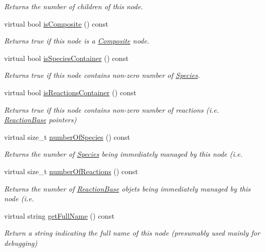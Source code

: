\begin{DoxyCompactItemize}
\begin{DoxyCompactList}\small\item\em Returns the number of children of this node. \end{DoxyCompactList}\item 
virtual bool \hyperlink{classComponent_a14bcb60799865752cd293fba2076d84a}{is\+Composite} () const 
\begin{DoxyCompactList}\small\item\em Returns true if this node is a \hyperlink{classComposite}{Composite} node. \end{DoxyCompactList}\item 
virtual bool \hyperlink{classComponent_a0daf865ff32aff9e68316c65b681cbf9}{is\+Species\+Container} () const 
\begin{DoxyCompactList}\small\item\em Returns true if this node contains non-\/zero number of \hyperlink{classSpecies}{Species}. \end{DoxyCompactList}\item 
virtual bool \hyperlink{classComponent_a506e080028078ef9a753d854c60904a3}{is\+Reactions\+Container} () const 
\begin{DoxyCompactList}\small\item\em Returns true if this node contains non-\/zero number of reactions (i.\+e. \hyperlink{classReactionBase}{Reaction\+Base} pointers) \end{DoxyCompactList}\item 
virtual size\+\_\+t \hyperlink{classComponent_ae99bcb165a9403e64ffea2b840192b4c}{number\+Of\+Species} () const 
\begin{DoxyCompactList}\small\item\em Returns the number of \hyperlink{classSpecies}{Species} being immediately managed by this node (i.\+e. \end{DoxyCompactList}\item 
virtual size\+\_\+t \hyperlink{classComponent_a116a02dd48baa6bf46c1162998548814}{number\+Of\+Reactions} () const 
\begin{DoxyCompactList}\small\item\em Returns the number of \hyperlink{classReactionBase}{Reaction\+Base} objets being immediately managed by this node (i.\+e. \end{DoxyCompactList}\item 
virtual string \hyperlink{classComponent_a42dd891a934150f6d6ef74b9850d4b5c}{get\+Full\+Name} () const 
\begin{DoxyCompactList}\small\item\em Return a string indicating the full name of this node (presumably used mainly for debugging) \end{DoxyCompactList}\item 

\end{DoxyCompactItemize}
